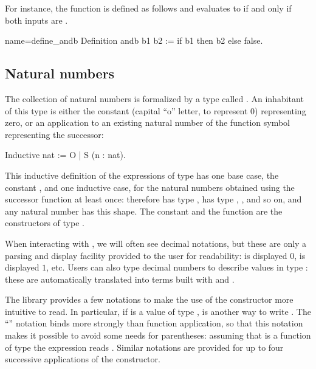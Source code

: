 For instance, the function  is defined as follows and
evaluates to  if and only if both inputs are .

\begin{coq}{name=define_andb}{}
Definition andb b1 b2 := if b1 then b2 else false.
\end{coq}


\subsection{Natural numbers}
\label{ssec:nat}

The collection of natural numbers is formalized by a type called
. An inhabitant of this type is either the constant 
(capital ``o'' letter, to represent $0$) representing zero, or an
application to an existing natural number of the function symbol 
representing the successor:

\begin{coq}{}{}
Inductive nat := O | S (n : nat).
\end{coq}

This inductive definition of the expressions of type  has one
base case, the constant , and one inductive case, for the natural
numbers obtained using the successor function at least once: therefore
 has type ,  has type , , and
so on, and any natural number has this shape. The constant  and
the function  are the constructors of type .

When interacting with
\Coq{}, we will often see decimal
notations, but these are only a parsing and display
facility provided to the user for readability:  is displayed
$0$,  is displayed $1$, etc.  Users can also type decimal
numbers to describe values in type : these are automatically
translated into terms built with  and .

The \mcbMC{} library provides a few notations to make the use of the
constructor  more intuitive to read.  In particular, if 
is a value of type ,  is another way to write
.  The ``'' notation binds more strongly than function
application, so that this notation makes it possible to avoid some
needs for parentheses: assuming  that  is a function of type
 the expression  reads
. Similar notations are provided for up to four
successive applications of the  constructor.

